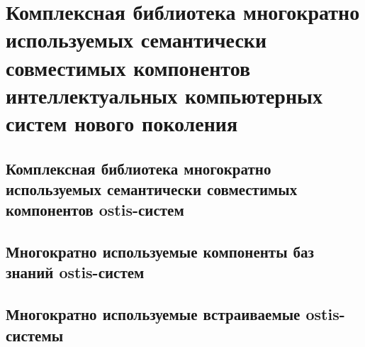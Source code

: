 \chapter{Комплексная библиотека многократно используемых семантически совместимых компонентов интеллектуальных компьютерных систем нового поколения}
\label{chapter_library}


\section{Комплексная библиотека многократно используемых семантически совместимых компонентов ostis-систем}
\section{Многократно используемые компоненты баз знаний ostis-систем}
\section{Многократно используемые встраиваемые ostis-системы}

%